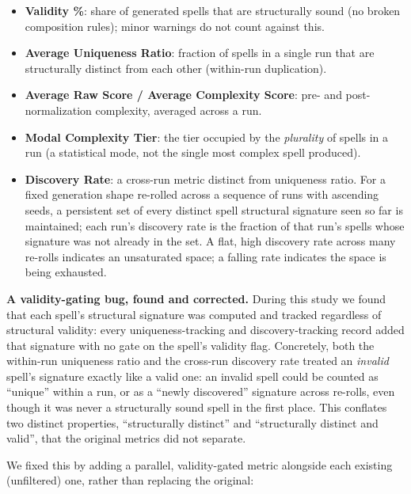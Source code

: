 \documentclass[]{article}
\begin{document}
        \begin{itemize}
            \item 
                \textbf{Validity \%}: share of generated spells that are structurally sound (no broken composition rules); minor warnings do not count against this.
            \item 
                \textbf{Average Uniqueness Ratio}: fraction of spells in a single run that are structurally distinct from each other (within-run duplication).
            \item 
                \textbf{Average Raw Score / Average Complexity Score}: pre- and post-normalization complexity, averaged across a run.
            \item 
                \textbf{Modal Complexity Tier}: the tier occupied by the \textit{plurality} of spells in a run (a statistical mode, not the single most complex spell produced).
            \item 
                \textbf{Discovery Rate}: a cross-run metric distinct from uniqueness ratio. For a fixed generation shape re-rolled across a sequence of runs with ascending seeds, a persistent set of every distinct spell structural signature seen so far is maintained; each run's discovery rate is the fraction of that run's spells whose signature was not already in the set. A flat, high discovery rate across many re-rolls indicates an unsaturated space; a falling rate indicates the space is being exhausted.
        \end{itemize}
        
        \textbf{A validity-gating bug, found and corrected.} During this study we found that each spell's structural signature was computed and tracked regardless of structural validity: every uniqueness-tracking and discovery-tracking record added that signature with no gate on the spell's validity flag. Concretely, both the within-run uniqueness ratio and the cross-run discovery rate treated an \textit{invalid} spell's signature exactly like a valid one: an invalid spell could be counted as ``unique'' within a run, or as a ``newly discovered'' signature across re-rolls, even though it was never a structurally sound spell in the first place. This conflates two distinct properties, ``structurally distinct'' and ``structurally distinct and valid'', that the original metrics did not separate.

        We fixed this by adding a parallel, validity-gated metric alongside each existing (unfiltered) one, rather than replacing the original:
\end{document}
